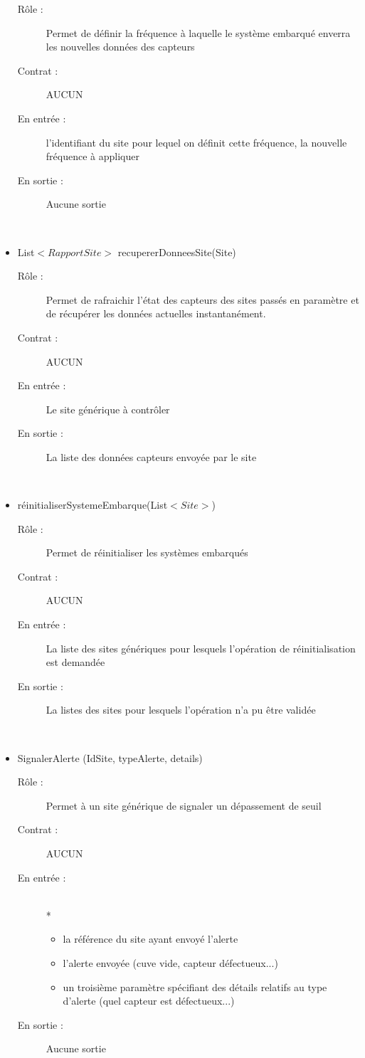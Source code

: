 \begin{itemize}
	\begin{description} 
		\item[Rôle :] Permet de définir la fréquence à laquelle le système embarqué enverra les nouvelles données des capteurs
		\item[Contrat :] AUCUN 
		\item[En entrée :] l'identifiant du site pour lequel on définit cette fréquence, la nouvelle fréquence à appliquer
		\item[En sortie :] Aucune sortie
	\end{description}
	~\\
	\item List$<RapportSite>$ recupererDonneesSite(Site) 
	\begin{description} 
		\item[Rôle :] Permet de rafraichir l'état des capteurs des sites passés en paramètre et de récupérer les données actuelles instantanément.
		\item[Contrat :] AUCUN 
		\item[En entrée :] Le site générique à contrôler
		\item[En sortie :] La liste des données capteurs envoyée par le site
	\end{description}
	~\\
	\item réinitialiserSystemeEmbarque(List$<Site>$) 
	\begin{description} 
		\item[Rôle :] Permet de réinitialiser les systèmes embarqués
		\item[Contrat :] AUCUN
		\item[En entrée :] La liste des sites génériques pour lesquels l'opération de réinitialisation est demandée
		\item[En sortie :] La listes des sites pour lesquels l'opération n'a pu être validée 
	\end{description}
	~\\
	\item SignalerAlerte (IdSite, typeAlerte, details)
	\begin{description} 
		\item[Rôle :] Permet à un site générique de signaler un dépassement de seuil
		\item[Contrat :] AUCUN
		\item[En entrée :]
		~\\*
		\begin{itemize}
			\item la référence du site ayant envoyé l'alerte
			\item l'alerte envoyée (cuve vide, capteur défectueux...)
			\item un troisième paramètre spécifiant des détails relatifs au type d'alerte (quel capteur est défectueux...)
		\end{itemize}
		\item[En sortie :] Aucune sortie
	\end{description}
	~\\

\end{itemize}


